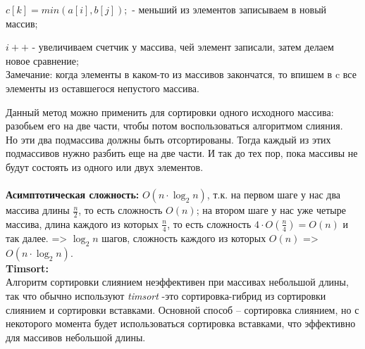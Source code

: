 \documentclass[a4paper,12pt]{article}
\begin{document}
$c[k] = min(a[i],b[j]); $ - меньший из элементов записываем в новый массив;

$i++$ - увеличиваем счетчик у массива, чей элемент записали, затем делаем новое сравнение;\\ Замечание: когда элементы в каком-то из массивов закончатся, то впишем в c все элементы из оставшегося непустого массива.

Данный метод можно применить для сортировки одного исходного массива: разобьем его на две части, чтобы потом воспользоваться алгоритмом слияния. \\Но эти два подмассива должны быть отсортированы. Тогда каждый из этих подмассивов нужно разбить еще на две части. И так до тех пор, пока массивы не будут состоять из одного или двух элементов.\\ \\
\textbf{Асимптотическая сложность:} $O(n \cdot \log_{2}n)$, т.к. на первом шаге у нас два массива длины $\frac{n}{2}$, то есть сложность $O(n)$; на втором шаге у нас уже четыре массива, длина каждого из которых $\frac{n}{4}$, то есть сложность $4 \cdot O(\frac{n}{4}) = O(n)$ и так далее. => $\log_{2}n$ шагов, сложность каждого из которых $O(n)$ => $O(n \cdot \log_{2}n)$.
\\

\textbf{Timsort:}\\
Алгоритм сортировки слиянием неэффективен при массивах небольшой длины, так что обычно используют {\slshape timsort} -это сортировка-гибрид из сортировки слиянием и сортировки вставками. Основной способ – сортировка слиянием, но с некоторого момента будет использоваться сортировка вставками, что эффективно для массивов небольшой длины.
\end{document}
